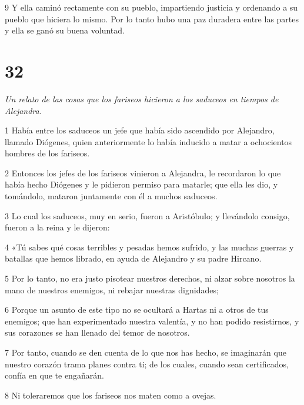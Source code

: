 \par 9 Y ella caminó rectamente con su pueblo, impartiendo justicia y ordenando a su pueblo que hiciera lo mismo. Por lo tanto hubo una paz duradera entre las partes y ella se ganó su buena voluntad.

\chapter{32}

\par \textit{Un relato de las cosas que los fariseos hicieron a los saduceos en tiempos de Alejandra.}

\par 1 Había entre los saduceos un jefe que había sido ascendido por Alejandro, llamado Diógenes, quien anteriormente lo había inducido a matar a ochocientos hombres de los fariseos.

\par 2 Entonces los jefes de los fariseos vinieron a Alejandra, le recordaron lo que había hecho Diógenes y le pidieron permiso para matarle; que ella les dio, y tomándolo, mataron juntamente con él a muchos saduceos.

\par 3 Lo cual los saduceos, muy en serio, fueron a Aristóbulo; y llevándolo consigo, fueron a la reina y le dijeron:

\par 4 «Tú sabes qué cosas terribles y pesadas hemos sufrido, y las muchas guerras y batallas que hemos librado, en ayuda de Alejandro y su padre Hircano.

\par 5 Por lo tanto, no era justo pisotear nuestros derechos, ni alzar sobre nosotros la mano de nuestros enemigos, ni rebajar nuestras dignidades;

\par 6 Porque un asunto de este tipo no se ocultará a Hartas ni a otros de tus enemigos; que han experimentado nuestra valentía, y no han podido resistirnos, y sus corazones se han llenado del temor de nosotros.

\par 7 Por tanto, cuando se den cuenta de lo que nos has hecho, se imaginarán que nuestro corazón trama planes contra ti; de los cuales, cuando sean certificados, confía en que te engañarán.

\par 8 Ni toleraremos que los fariseos nos maten como a ovejas.

